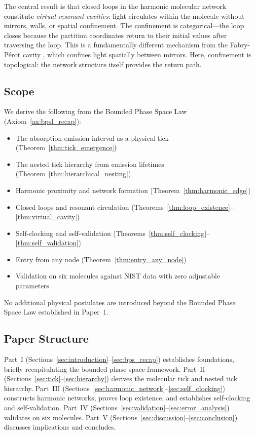 \documentclass[11pt,a4paper]{article}
\theoremstyle{definition}
\theoremstyle{remark}
\begin{document}
The central result is that closed loops in the harmonic molecular network constitute \emph{virtual resonant cavities}: light circulates within the molecule without mirrors, walls, or spatial confinement. The confinement is categorical---the loop closes because the partition coordinates return to their initial values after traversing the loop. This is a fundamentally different mechanism from the Fabry-P\'{e}rot cavity \citep{fabry1899}, which confines light spatially between mirrors. Here, confinement is topological: the network structure itself provides the return path.

\subsection{Scope}

We derive the following from the Bounded Phase Space Law (Axiom~\ref{ax:bpsl_recap}):
\begin{itemize}[nosep]
\item The absorption-emission interval as a physical tick (Theorem~\ref{thm:tick_emergence})
\item The nested tick hierarchy from emission lifetimes (Theorem~\ref{thm:hierarchical_nesting})
\item Harmonic proximity and network formation (Theorem~\ref{thm:harmonic_edge})
\item Closed loops and resonant circulation (Theorems~\ref{thm:loop_existence}--\ref{thm:virtual_cavity})
\item Self-clocking and self-validation (Theorems~\ref{thm:self_clocking}--\ref{thm:self_validation})
\item Entry from any node (Theorem~\ref{thm:entry_any_node})
\item Validation on six molecules against NIST data with zero adjustable parameters
\end{itemize}

No additional physical postulates are introduced beyond the Bounded Phase Space Law established in Paper~1.

\subsection{Paper Structure}

Part~I (Sections~\ref{sec:introduction}--\ref{sec:bps_recap}) establishes foundations, briefly recapitulating the bounded phase space framework. Part~II (Sections~\ref{sec:tick}--\ref{sec:hierarchy}) derives the molecular tick and nested tick hierarchy. Part~III (Sections~\ref{sec:harmonic_network}--\ref{sec:self_clocking}) constructs harmonic networks, proves loop existence, and establishes self-clocking and self-validation. Part~IV (Sections~\ref{sec:validation}--\ref{sec:error_analysis}) validates on six molecules. Part~V (Sections~\ref{sec:discussion}--\ref{sec:conclusion}) discusses implications and concludes.
\end{document}
